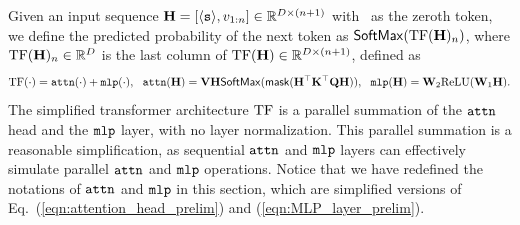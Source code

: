 Given an input sequence ${\mathbf H} = [\texttt{$\langle \texttt{s}\rangle$}, v_{1:n}] \in \mathbb{R}^{D \times (n+1)}$ with \bos~as the zeroth token, we define the predicted probability of the next token as ${\sf SoftMax}({\rm TF}({\mathbf H})_n)$, where ${\rm TF}({\mathbf H})_n \in \mathbb{R}^D$ is the last column of ${\rm TF}({\mathbf H}) \in \mathbb{R}^{D \times (n+1)}$, defined as
\begin{equation}\label{eqn:simplified_transformer}
{\rm TF}(\cdot) = {\tt attn}(\cdot) + {\tt mlp}(\cdot),~~{\tt attn}({\mathbf H}) = {\mathbf V} {\mathbf H} {\sf SoftMax}({\sf mask}({\mathbf H}^\top {\mathbf K}^\top {\mathbf Q} {\mathbf H} ) ),~~ {\tt mlp}({\mathbf H}) = {\mathbf W}_2 \mathrm{ReLU}( {\mathbf W}_1 {\mathbf H}).
\end{equation}
The simplified transformer architecture ${\rm TF}$ is a parallel summation of the ${\tt attn}$ head and the ${\tt mlp}$ layer, with no layer normalization. This parallel summation is a reasonable simplification, as sequential ${\tt attn}$ and ${\tt mlp}$ layers can effectively simulate parallel ${\tt attn}$ and ${\tt mlp}$ operations. Notice that we have redefined the notations of ${\tt attn}$ and ${\tt mlp}$ in this section, which are simplified versions of Eq.~(\ref{eqn:attention_head_prelim}) and (\ref{eqn:MLP_layer_prelim}). %


